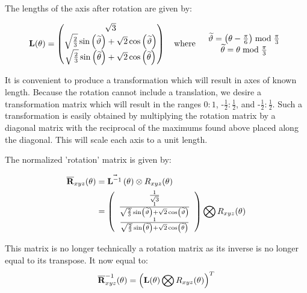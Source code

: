 The lengths of the axis after rotation are given by:

\begin{equation}\label{eq:L}
\mathbf{L}(\theta) =
\begin{pmatrix}
\sqrt{3} \\
 \sqrt{\frac{2}{3}} \sin \left(\widetilde{\vartheta}\right) + \sqrt{2} \cos \left(\widetilde{\vartheta}\right) \\  
\sqrt{\frac{2}{3}} \sin \left(\widetilde{\theta}\right) + \sqrt{2} \cos \left(\widetilde{\theta}\right) 
\end{pmatrix}
\quad \text{where}  \quad 
\begin{array}{c}
\widetilde{\vartheta} = \left(\theta - \frac{\pi}{6}\right) \bmod \frac{\pi }{3} \\
\widetilde{\theta} = \theta  \bmod \frac{\pi }{3} 
\end{array}
\end{equation}

It is convenient to produce a transformation which will result in axes of known length. Because the rotation cannot include a translation, we desire a transformation matrix which will result in the ranges $0:1$, -$\frac{1}2:\frac{1}2$, and -$\frac{1}2:\frac{1}2$. Such a transformation is easily obtained by multiplying the rotation matrix by a diagonal matrix with the reciprocal of the maximums found above placed along the diagonal. This will scale each axis to a unit length.

The normalized 'rotation' matrix is given by:


\begin{align}\label{eq:NormRxyz3}
 \overline{\R}_{xyz}(\theta) &= \nS[\theta] \otimes R_{xyz}(\theta) \\
&=\left(
\begin{array}{c}
 \frac{1}{\sqrt{3}}  \\
 \frac{1}{\sqrt{\frac{2}{3}} \sin \left(\widetilde{\vartheta}\right) + \sqrt{2} \cos \left(\widetilde{\vartheta}\right)} \\
 \frac{1}{\sqrt{\frac{2}{3}} \sin \left(\widetilde{\theta}\right) + \sqrt{2} \cos \left(\widetilde{\theta}\right)  }  \\
\end{array}
\right)
\bigotimes
R_{xyz}(\theta)
\end{align}

This matrix is no longer technically a rotation matrix as its inverse is no longer equal to its transpose. It now equal to:
\begin{equation}\label{eq:NormRxyz3Inverse}
 \overline{\R}_{xyz}^{-1}(\theta) =
\left(  \mathbf{L}(\theta)  \bigotimes R_{xyz}(\theta)
\right)^{T} 
\end{equation}


